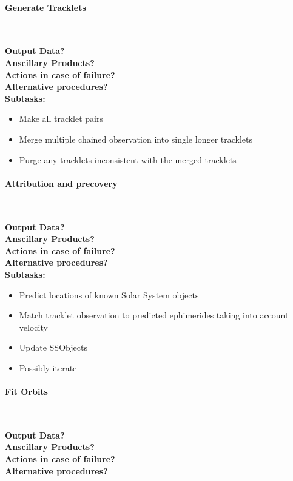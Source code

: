 \paragraph{Generate Tracklets}~

\noindent
{\bf Output Data?}\\
{\bf Anscillary Products?}\\
{\bf Actions in case of failure?}\\
{\bf Alternative procedures?}\\

\noindent
{\bf Subtasks:}
\begin{itemize}
\item Make all tracklet pairs
\item Merge multiple chained observation into single longer tracklets
\item Purge any tracklets inconsistent with the merged tracklets
\end{itemize}

\paragraph{Attribution and precovery}~

\noindent
{\bf Output Data?}\\
{\bf Anscillary Products?}\\
{\bf Actions in case of failure?}\\
{\bf Alternative procedures?}\\

\noindent
{\bf Subtasks:}
\begin{itemize}
\item Predict locations of known Solar System objects
\item Match tracklet observation to predicted ephimerides taking into account velocity
\item Update SSObjects
\item Possibly iterate
\end{itemize}

\paragraph{Fit Orbits}~

\noindent
{\bf Output Data?}\\
{\bf Anscillary Products?}\\
{\bf Actions in case of failure?}\\
{\bf Alternative procedures?}\\

